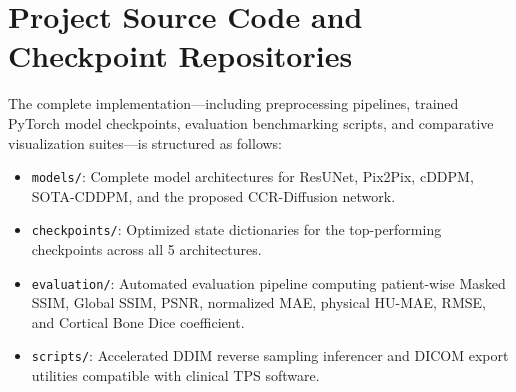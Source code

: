 \section{Project Source Code and Checkpoint Repositories}
The complete implementation---including preprocessing pipelines, trained PyTorch model checkpoints, evaluation benchmarking scripts, and comparative visualization suites---is structured as follows:
\begin{itemize}
    \item \texttt{models/}: Complete model architectures for ResUNet, Pix2Pix, cDDPM, SOTA-CDDPM, and the proposed CCR-Diffusion network.
    \item \texttt{checkpoints/}: Optimized state dictionaries for the top-performing checkpoints across all 5 architectures.
    \item \texttt{evaluation/}: Automated evaluation pipeline computing patient-wise Masked SSIM, Global SSIM, PSNR, normalized MAE, physical HU-MAE, RMSE, and Cortical Bone Dice coefficient.
    \item \texttt{scripts/}: Accelerated DDIM reverse sampling inferencer and DICOM export utilities compatible with clinical TPS software.
\end{itemize}
